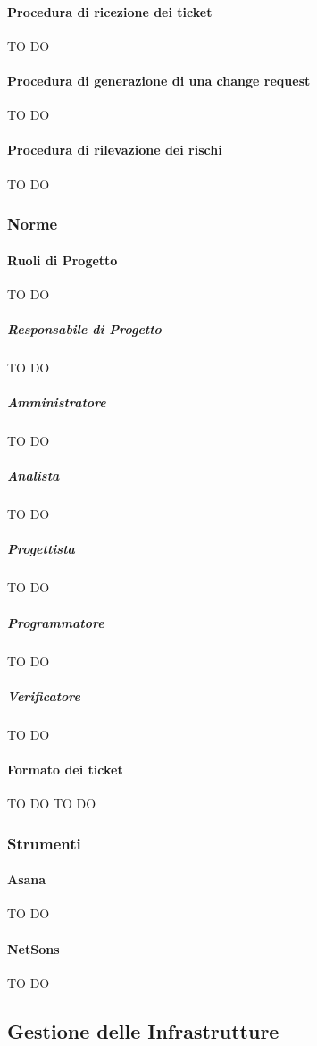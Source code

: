 			\paragraph{Procedura di ricezione dei ticket}
TO DO
			\paragraph{Procedura di generazione di una change request}
TO DO
			\paragraph{Procedura di rilevazione dei rischi}
TO DO
		\subsubsection{Norme}
			\paragraph{Ruoli di Progetto}
TO DO
				\subparagraph{Responsabile di Progetto}
TO DO
				\subparagraph{Amministratore}
TO DO
				\subparagraph{Analista}
TO DO
				\subparagraph{Progettista}
TO DO
				\subparagraph{Programmatore}
TO DO
				\subparagraph{Verificatore}
TO DO
			
			\paragraph{Formato dei ticket}
TO DO			
TO DO	
	
		\subsubsection{Strumenti}
			\paragraph{Asana} \label{sec:Asana}
TO DO
			\paragraph{NetSons}
TO DO
			
			\paragraph{}
	\subsection{Gestione delle Infrastrutture}
